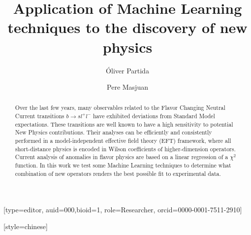 \documentclass[a4paper,fleqn]{cas-dc}
\begin{document}
\let\WriteBookmarks\relax
\def\floatpagepagefraction{1}
\def\textpagefraction{.001}

\title [mode = title]{Application of Machine Learning techniques to the discovery of new physics}                      




\author[1]{Óliver Partida}[type=editor,
                        auid=000,bioid=1,
                        role=Researcher,
                        orcid=0000-0001-7511-2910]

\address[1]{Universitat Autónoma de Barcelona, E-08193 Bellaterra (Barcelona), Catalunya.}

\address[2]{Grup de Física Teórica (Departament de Física), Universitat Autónoma de Barcelona, E-08193 Bellaterra (Barcelona), Catalunya.}

\address[3]{Institut de Física d'Altes Energies (IFAE), The Barcelona Institute of Science and Technology, campus UAB, E-08193 Bellaterra (Barcelona), Catalunya.}

\author[2,3]{Pere Masjuan}[style=chinese]


\begin{abstract}
Over the last few years, many observables related
to the Flavor Changing Neutral Current transitions \(b\rightarrow sl^+l^- \) have exhibited deviations from Standard Model expectations. These transitions are well known to have a high sensitivity to potential New Physics contributions. Their analyses can be efficiently and consistently performed in a model-independent effective field theory (EFT) framework, where all
short-distance physics is encoded in Wilson coefficients of higher-dimension operators. Current analysis of anomalies in 
flavor physics are based on a linear regression of a \(\chi^2 \) function. In this work we test some Machine Learning techniques to  determine what combination of new operators renders the best possible fit to experimental data.
\end{abstract}


\end{document}
